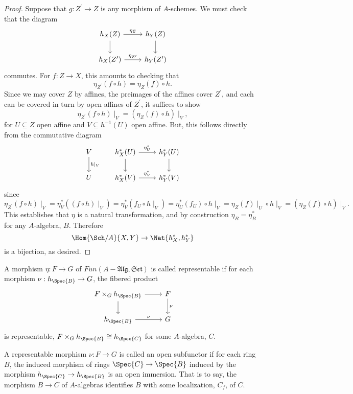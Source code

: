 \documentclass[10pt]{amsart}
\begin{document}
\begin{prop}
\begin{proof}
    Suppose that $g : Z^\prime \rightarrow Z$ is any morphism of $A$-schemes.
    We must check that the diagram
    $$\begin{tikzcd}
      h_X(Z) \arrow{r}{\eta_Z}\arrow{d} & h_Y(Z)\arrow{d}\\
      h_X(Z^\prime)\arrow{r}{\eta_{Z^\prime}} & h_Y(Z^\prime)
    \end{tikzcd}$$
    commutes.
    For $f : Z \rightarrow X$, this amounts to checking that
    $$\eta_{Z^\prime}(f \circ h) = \eta_Z(f) \circ h.$$
    Since we may cover $Z$ by affines, the preimages of the affines cover $Z^\prime$, and each can be covered in turn by open affines of $Z^\prime$, it suffices to show
    $$\eta_{Z^\prime}(f \circ h)\mid_V = \left(\eta_Z(f) \circ h\right) \mid_V,$$
    for $U \subseteq Z$ open affine and $V \subseteq h^{-1}(U)$ open affine.
    But, this follows directly from the commutative diagram
    $$\begin{tikzcd}
      V\arrow{d}{h\mid_V} & h_X^*(U)\arrow{r}{\eta_U^*}\arrow{d} & h_Y^*(U)\arrow{d}\\
      U & h_X^*(V)\arrow{r}{\eta_V^*} & h_Y^*(V)
    \end{tikzcd}$$
    since
    $$\eta_{Z^\prime}(f \circ h)\mid_V = \eta_V^*\left(\left(f \circ h\right) \mid_V\right) = \eta_V^*(f_U \circ h\mid_V) = \eta_U^*(f_U) \circ h\mid_V = \eta_Z(f)\mid_U \circ h\mid_V = \left(\eta_Z(f) \circ h\right) \mid_V.$$
    This establishes that $\eta$ is a natural transformation, and by construction $\eta_B = \eta^*_B$ for any $A$-algebra, $B$.
    Therefore
    $$\Hom{\Sch/A}{X,Y} \rightarrow \Nat{h_X^*, h_Y^*}$$
    is a bijection, as desired.
  \end{proof}
\end{prop}

\begin{defn}
  A morphism $\eta : F \rightarrow G$ of $Fun(A-\mathfrak{Alg}, \mathfrak{Set})$ is called representable if for each morphism $\nu : h_{\Spec{B}} \rightarrow G$, the fibered product
  $$\begin{tikzcd}
    F \times_G h_{\Spec{B}}\arrow{d}\arrow{r} & F\arrow{d}{\nu}\\
    h_{\Spec{B}}\arrow{r}{\nu} & G
  \end{tikzcd}$$
  is representable, $F \times_G h_{\Spec{B}} \cong h_{\Spec{C}}$ for some $A$-algebra, $C$.
  \begin{defn}
    A representable morphism $\nu : F \rightarrow G$ is called an open subfunctor if for each ring $B$, the induced morphism of rings $\Spec{C} \rightarrow \Spec{B}$ induced by the morphism $h_{\Spec{C}} \rightarrow h_{\Spec{B}}$ is an open immersion.
    That is to say, the morphism $B \rightarrow C$ of $A$-algebras identifies $B$ with some localization, $C_f$, of $C$.
  \end{defn}
\end{defn}
\end{document}
